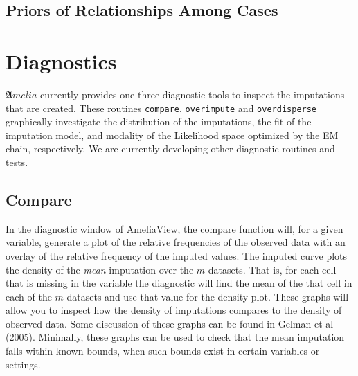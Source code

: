 \documentclass[12pt,titlepage]{article}
\newcommand{\Amelia}{\ensuremath{\mathfrak Amelia} }
\begin{document}
\subsection{Priors of Relationships Among Cases}
\label{sec:casepri}





\section{Diagnostics}
\label{sec:diag}
\Amelia currently provides one three diagnostic tools to inspect the
imputations that are created.  These routines \texttt{compare},
\texttt{overimpute} and \texttt{overdisperse} graphically investigate
the distribution of the imputations, the fit of the imputation model,
and modality of the Likelihood space optimized by the EM chain,
respectively.  We are currently developing other diagnostic routines
and tests.

\subsection{Compare}
In the diagnostic window of AmeliaView, the compare function will, for
a given variable, generate a plot of the relative frequencies of the
observed data with an overlay of the relative frequency of the imputed
values.  The imputed curve plots the density of the \emph{mean}
imputation over the $m$ datasets.  That is, for each cell that is
missing in the variable the diagnostic will find the mean of the that
cell in each of the $m$ datasets and use that value for the density
plot.  These graphs will allow you to inspect how the density of
imputations compares to the density of observed data. Some discussion
of these graphs can be found in Gelman et al (2005).  Minimally, these
graphs can be used to check that the mean imputation falls within
known bounds, when such bounds exist in certain variables or settings.
\end{document}
